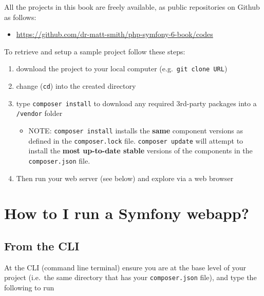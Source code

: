 \documentclass[a4paperpaper,openright]{book}
\newenvironment{Shaded}{}{}
\newcommand{\ExtensionTok}[1]{#1}
\newcommand{\NormalTok}[1]{#1}
\providecommand{\tightlist}{%
  \setlength{\itemsep}{0pt}\setlength{\parskip}{0pt}}
\begin{document}
All the projects in this book are freely available, as public
repositories on Github as follows:

\begin{itemize}
\tightlist
\item
  \url{https://github.com/dr-matt-smith/php-symfony-6-book/codes}
\end{itemize}

To retrieve and setup a sample project follow these steps:

\begin{enumerate}
\def\labelenumi{\arabic{enumi}.}
\item
  download the project to your local computer
  (e.g.~\texttt{git\ clone\ URL})
\item
  change (\texttt{cd}) into the created directory
\item
  type \texttt{composer\ install} to download any required 3rd-party
  packages into a \texttt{/vendor} folder

  \begin{itemize}
  \tightlist
  \item
    NOTE: \texttt{composer\ install} installs the \textbf{same}
    component versions as defined in the \texttt{composer.lock} file.
    \texttt{composer\ update} will attempt to install the \textbf{most
    up-to-date stable} versions of the components in the
    \texttt{composer.json} file.
  \end{itemize}
\item
  Then run your web server (see below) and explore via a web browser
\end{enumerate}

\hypertarget{how-to-i-run-a-symfony-webapp}{%
\section{How to I run a Symfony
webapp?}\label{how-to-i-run-a-symfony-webapp}}

\hypertarget{from-the-cli}{%
\subsection{From the CLI}\label{from-the-cli}}

At the CLI (command line terminal) ensure you are at the base level of
your project (i.e.~the same directory that has your
\texttt{composer.json} file), and type the following to run

\begin{Shaded}
\end{Shaded}
\end{document}
